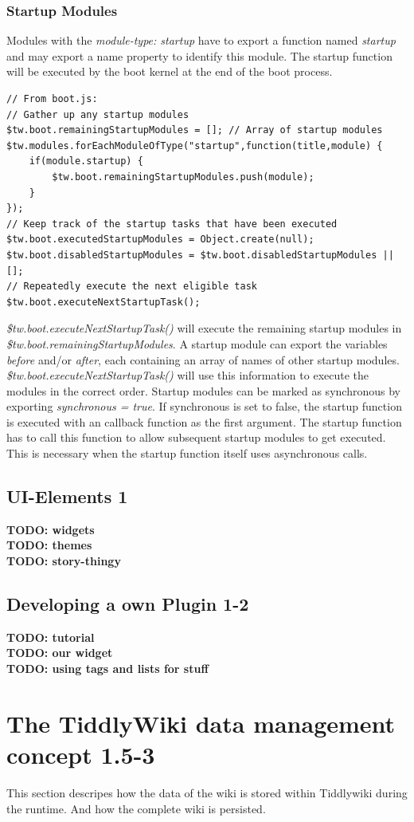 \documentclass[12pt,a4paper]{article}
\newcommand{\todo}[1]{{\bf TODO: #1}\\
}
\begin{document}
\subsubsection*{Startup Modules}
Modules with the \textit{module-type: startup} have to export a  function named \textit{startup} and may export a name property to identify this module. The startup function will be executed by the boot kernel at the end of the boot process.

\begin{lstlisting}[caption={Boot kernel processing startup modules},label=lst:startup-modules]
// From boot.js:
// Gather up any startup modules
$tw.boot.remainingStartupModules = []; // Array of startup modules
$tw.modules.forEachModuleOfType("startup",function(title,module) {
	if(module.startup) {
		$tw.boot.remainingStartupModules.push(module);
	}
});
// Keep track of the startup tasks that have been executed
$tw.boot.executedStartupModules = Object.create(null);
$tw.boot.disabledStartupModules = $tw.boot.disabledStartupModules || [];
// Repeatedly execute the next eligible task
$tw.boot.executeNextStartupTask();
\end{lstlisting}

\textit{\$tw.boot.executeNextStartupTask()} will execute the remaining startup modules in \textit{\$tw.boot.remainingStartupModules}. A startup module can export the variables \textit{before} and/or \textit{after}, each containing an array of names of other startup modules. \textit{\$tw.boot.executeNextStartupTask()} will use this information to execute the modules in the correct order. Startup modules can be marked as synchronous by exporting \textit{synchronous = true}. If synchronous is set to false, the startup function is executed with an callback function as the first argument. The startup function has to call this function to allow subsequent startup modules to get executed. This is necessary when the startup function itself uses asynchronous calls.

\subsection{UI-Elements 1}
\todo{widgets}
\todo{themes}
\todo{story-thingy}
\subsection{Developing a own Plugin 1-2}
\todo{tutorial}
\todo{our widget}
\todo{using tags and lists for stuff}
\newpage
\section{The TiddlyWiki data management concept 1.5-3}
This section descripes how the data of the wiki is stored within Tiddlywiki during the runtime. And how the complete wiki is persisted.
\end{document}
